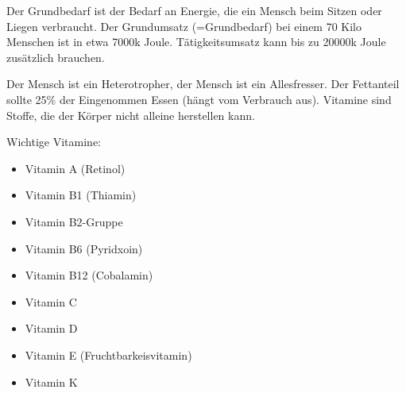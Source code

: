 \documentclass[a4paper]{article}
\begin{document}
Der Grundbedarf ist der Bedarf an Energie, die ein Mensch beim Sitzen oder Liegen verbraucht. Der Grundumsatz (=Grundbedarf) bei einem 70 Kilo Menschen ist in etwa 7000k Joule. Tätigkeitsumsatz kann bis zu 20000k Joule zusätzlich brauchen.

Der Mensch ist ein Heterotropher, der Mensch ist ein Allesfresser. Der Fettanteil sollte 25\% der Eingenommen Essen (hängt vom Verbrauch aus). Vitamine sind Stoffe, die der Körper nicht alleine herstellen kann.

Wichtige Vitamine:

\begin{itemize}
\item Vitamin A (Retinol)
\item Vitamin B1 (Thiamin)
\item Vitamin B2-Gruppe 
\item Vitamin B6 (Pyridxoin)
\item Vitamin B12 (Cobalamin)
\item Vitamin C
\item Vitamin D
\item Vitamin E (Fruchtbarkeisvitamin)
\item Vitamin K
\end{itemize}
\end{document}
